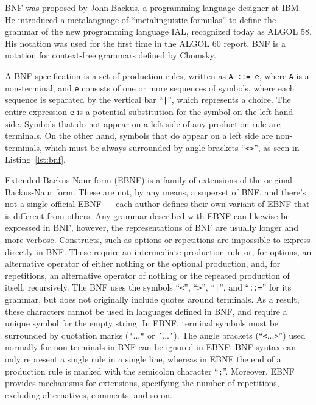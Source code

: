 \documentclass[english,bachelors,forcepolishlogotype]{wizthesis}
\begin{document}
BNF was proposed by John Backus, a programming language designer at IBM. He
introduced a metalanguage of ``metalinguistic formulas'' to define the grammar
of the new programming language IAL, recognized today as ALGOL 58. His notation
was used for the first time in the ALGOL 60 report. BNF is a notation for
context-free grammars defined by Chomsky.

A BNF specification is a set of production rules, written as \texttt{A ::= e},
where \texttt{A} is a non-terminal, and \texttt{e} consists of one or more
sequences of symbols, where each sequence is separated by the vertical bar
``\texttt{|}'', which represents a choice. The entire expression \texttt{e} is a
potential substitution for the symbol on the left-hand side. Symbols that do not
appear on a left side of any production rule are terminals. On the other hand,
symbols that do appear on a left side are non-terminals, which must be always
surrounded by angle brackets ``\texttt{<>}'', as seen in Listing~\ref{lst:bnf}.

Extended Backus-Naur form (EBNF) is a family of extensions of the original
Backus-Naur form. These are not, by any means, a superset of BNF, and there's
not a single official EBNF --- each author defines their own variant of EBNF
that is different from others. Any grammar described with EBNF can likewise be
expressed in BNF, however, the representations of BNF are usually longer and
more verbose. Constructs, such as options or repetitions are impossible to
express directly in BNF. These require an intermediate production rule or, for
options, an alternative operator of either nothing or the optional production,
and, for repetitions, an alternative operator of nothing or the repeated
production of itself, recursively. The BNF uses the symbols ``\texttt{<}'',
``\texttt{>}'', ``\texttt{|}'', and ``\texttt{::=}'' for its grammar, but does
not originally include quotes around terminals. As a result, these characters
cannot be used in languages defined in BNF, and require a unique symbol for the
empty string. In EBNF, terminal symbols must be surrounded by quotation marks
(\texttt{"}...\texttt{"} or \texttt{'}...\texttt{'}). The angle brackets
(``\texttt{<}...\texttt{>}'') used normally for non-terminals in BNF can be
ignored in EBNF. BNF syntax can only represent a single rule in a single line,
whereas in EBNF the end of a production rule is marked with the semicolon
character ``\texttt{;}''. Moreover, EBNF provides mechanisms for extensions,
specifying the number of repetitions, excluding alternatives, comments, and so
on.
\end{document}
